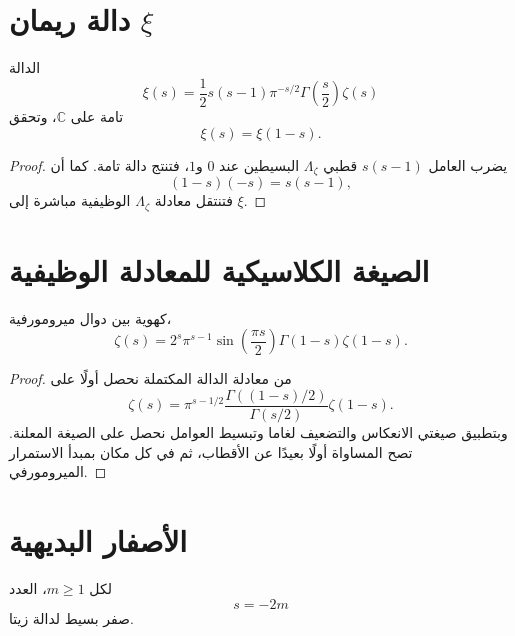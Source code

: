 \section{دالة ريمان \(\xi\)}

\begin{corollary}
\label{cor:riemann-xi-entire}
\provedhere
الدالة
\[
\xi(s)
=
\frac12 s(s-1)
\pi^{-s/2}\Gamma\!\left(\frac{s}{2}\right)\zeta(s)
\]
تامة على \(\mathbb{C}\)، وتحقق
\[
\xi(s)=\xi(1-s).
\]
\end{corollary}

\begin{proof}
يضرب العامل \(s(s-1)\) قطبي \(\Lambda_\zeta\) البسيطين عند \(0\)
و\(1\)، فتنتج دالة تامة. كما أن
\[
(1-s)(-s)=s(s-1),
\]
فتنتقل معادلة \(\Lambda_\zeta\) الوظيفية مباشرة إلى \(\xi\).
\end{proof}

\section{الصيغة الكلاسيكية للمعادلة الوظيفية}

\begin{corollary}
\label{cor:zeta-classical-functional-equation}
\provedhere
كهوية بين دوال ميرومورفية،
\[
\zeta(s)
=
2^s\pi^{s-1}
\sin\!\left(\frac{\pi s}{2}\right)
\Gamma(1-s)\zeta(1-s).
\]
\end{corollary}

\begin{proof}
من معادلة الدالة المكتملة نحصل أولًا على
\[
\zeta(s)
=
\pi^{s-1/2}
\frac{\Gamma((1-s)/2)}{\Gamma(s/2)}
\zeta(1-s).
\]
وبتطبيق صيغتي الانعكاس والتضعيف لغاما وتبسيط العوامل نحصل على الصيغة
المعلنة. تصح المساواة أولًا بعيدًا عن الأقطاب، ثم في كل مكان بمبدأ
الاستمرار الميرومورفي.
\end{proof}

\section{الأصفار البديهية}

\begin{corollary}
\label{cor:zeta-trivial-zeros}
\provedhere
لكل \(m\geq1\)، العدد
\[
s=-2m
\]
صفر بسيط لدالة زيتا.
\end{corollary}

